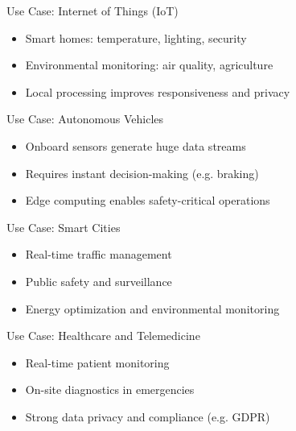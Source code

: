 \documentclass{beamer}
\begin{document}
\begin{frame}{Use Case: Internet of Things (IoT)}
  \begin{itemize}
    \item Smart homes: temperature, lighting, security
    \item Environmental monitoring: air quality, agriculture
    \item Local processing improves responsiveness and privacy
  \end{itemize}
\end{frame}

\begin{frame}{Use Case: Autonomous Vehicles}
  \begin{itemize}
    \item Onboard sensors generate huge data streams
    \item Requires instant decision-making (e.g. braking)
    \item Edge computing enables safety-critical operations
  \end{itemize}
\end{frame}

\begin{frame}{Use Case: Smart Cities}
  \begin{itemize}
    \item Real-time traffic management
    \item Public safety and surveillance
    \item Energy optimization and environmental monitoring
  \end{itemize}
\end{frame}

\begin{frame}{Use Case: Healthcare and Telemedicine}
  \begin{itemize}
    \item Real-time patient monitoring
    \item On-site diagnostics in emergencies
    \item Strong data privacy and compliance (e.g. GDPR)
  \end{itemize}
\end{frame}
\end{document}
